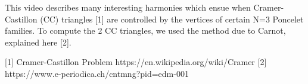 This video describes many interesting harmonies which ensue when Cramer-Castillon (CC) triangles [1] are controlled by the vertices of certain N=3 Poncelet families. To compute the 2 CC triangles, we used the method due to Carnot, explained here [2].

[1] Cramer-Castillon Problem https://en.wikipedia.org/wiki/Cramer%
[2] https://www.e-periodica.ch/cntmng?pid=edm-001%